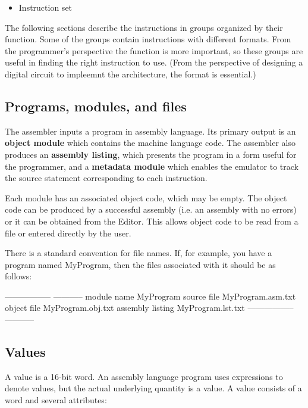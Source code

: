 \documentclass[11pt]{article}
\begin{document}
\begin{itemize}
\item Instruction set
\end{itemize}

The following sections describe the instructions in groups organized
by their function.  Some of the groups contain instructions with
different formats.  From the programmer's perspective the function is
more important, so these groups are useful in finding the right
instruction to use.  (From the perspective of designing a digital
circuit to impleemnt the architecture, the format is essential.)


\subsection*{Programs, modules, and files}
\label{sec:orge6fc2d9}

The assembler inputs a program in assembly language.  Its primary
output is an \textbf{object module} which contains the machine language code.
The assembler also produces an \textbf{assembly listing}, which presents the
program in a form useful for the programmer, and a \textbf{metadata module}
which enables the emulator to track the source statement corresponding
to each instruction.

Each module has an associated object code, which may be empty. The
object code can be produced by a successful assembly (i.e. an assembly
with no errors) or it can be obtained from the Editor.  This allows
object code to be read from a file or entered directly by the user.


There is a standard convention for file names.  If, for example, you
have a program named MyProgram, then the files associated with it
should be as follows:

-----------------  -----------
module name        MyProgram
source file        MyProgram.asm.txt
object file        MyProgram.obj.txt
assembly listing   MyProgram.lst.txt
-----------------  -----------

\subsection*{Values}
\label{sec:org761ba26}

A value is a 16-bit word.  An assembly language program uses
expressions to denote values, but the actual underlying quantity is a
value.  A value consists of a word and several attributes:
\end{document}
